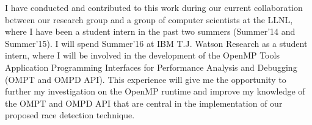 I have conducted and contributed to this work during our current collaboration
between our research group and a group of computer scientists at the LLNL,
where I have been a student intern in the past two summers (Summer'14 and
Summer'15).
%
I will spend Summer'16 at IBM T.J. Watson Research as a student intern, where
I will be involved in the development of the OpenMP Tools Application
Programming Interfaces for Performance Analysis and Debugging~\cite{ompt}
(OMPT and OMPD API).
%
This experience will give me the opportunity to further my investigation on
the OpenMP runtime and improve my knowledge of the OMPT and OMPD API that are
central in the implementation of our proposed race detection technique.

